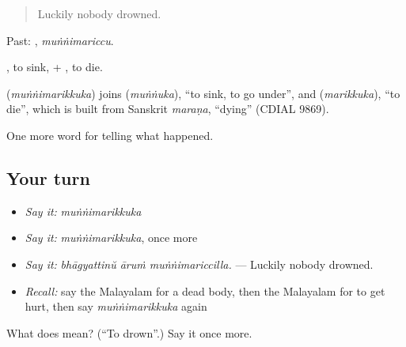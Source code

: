 \begin{quote}
Luckily nobody drowned.
\end{quote}

Past: , \emph{muṅṅimariccu}.

, to sink, + , to die.

\begin{cousinweb}
\textbf{} (\emph{muṅṅimarikkuka}) joins  (\emph{muṅṅuka}), \textquotedblleft{}to sink, to go under\textquotedblright{}, and  (\emph{marikkuka}), \textquotedblleft{}to die\textquotedblright{}, which is built from Sanskrit \emph{maraṇa}, \textquotedblleft{}dying\textquotedblright{} (CDIAL 9869).
\end{cousinweb}

\begin{grammarlens}[title={What you've built}]
One more word for telling what happened.
\end{grammarlens}

\subsection*{Your turn}
\begin{itemize}
\raggedright
  \item \emph{Say it:} \emph{muṅṅimarikkuka}
  \item \emph{Say it:} \emph{muṅṅimarikkuka}, once more
  \item \emph{Say it:} \emph{bhāgyattinŭ āruṁ muṅṅimariccilla.} — Luckily nobody drowned.
  \item \emph{Recall:} say the Malayalam for a dead body, then the Malayalam for to get hurt, then say \emph{muṅṅimarikkuka} again
\end{itemize}

\begin{tcolorbox}[breakable,colback=teal!4,colframe=teal!35!black,title={Before you move on}]
What does  mean? (\textquotedblleft{}To drown\textquotedblright{}.) Say it once more.
\end{tcolorbox}
